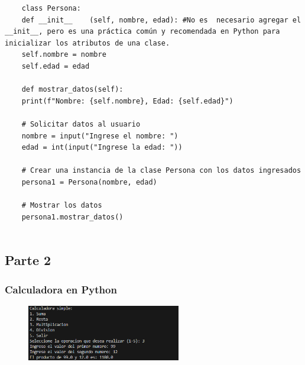 \documentclass[12pt, a4paper]{article}
\begin{document}
\begin{verbatim}
	class Persona:
	def __init__    (self, nombre, edad): #No es  necesario agregar el __init__, pero es una práctica común y recomendada en Python para inicializar los atributos de una clase.
	self.nombre = nombre
	self.edad = edad
	
	def mostrar_datos(self):
	print(f"Nombre: {self.nombre}, Edad: {self.edad}")
	
	# Solicitar datos al usuario
	nombre = input("Ingrese el nombre: ")
	edad = int(input("Ingrese la edad: "))
	
	# Crear una instancia de la clase Persona con los datos ingresados
	persona1 = Persona(nombre, edad)
	
	# Mostrar los datos
	persona1.mostrar_datos()
	
\end{verbatim}

	
\subsection*{Parte 2}

\vspace{0.5cm}

\subsubsection*{Calculadora en Python}

\begin{figure}[ht]
	\centering
	\includegraphics[width=0.6\textwidth]{images/calculadora_python.png}
	\label{fig:calculadora_python}
\end{figure}
\end{document}
